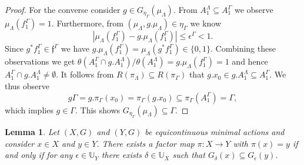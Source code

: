 \documentclass[12pt, reqno]{amsart}
\newtheorem{lemma}[theorem]{Lemma}
\theoremstyle{definition}
\theoremstyle{remark}
\numberwithin{equation}{section}
\theoremstyle{theorem}
\theoremstyle{remark}
\begin{document}
\begin{proof}
    For the converse consider $g\in G_{\eta_\Gamma}(\mu_\Lambda)$. 
    From $A_1^\Lambda\subseteq A_1^\Gamma$ we observe $\mu_\Lambda(f_1^\Gamma)=1$. 
    Furthermore, from $(\mu_\Lambda, g.\mu_\Lambda)\in \eta_\Gamma$ we know
    \[|\mu_\Lambda (f_1^\Gamma)-g.\mu_\Lambda(f_1^\Gamma)|\leq\epsilon^\Gamma<1.\]
    Since $g^*f_1^\Gamma\in \mathfrak{f}^\Gamma$ we have $g.\mu_\Lambda(f_1^\Gamma)=\mu_\Lambda(g^*f_1^\Gamma)\in \{0,1\}$. Combining these observations we get
    $\theta(A_1^\Gamma\cap g.A_1^\Lambda)/\theta(A_1^\Lambda)=g.\mu_\Lambda(f_1^\Gamma)=1$ and hence $A_1^\Gamma\cap g.A_1^\Lambda\neq \emptyset$. 
    It follows from $R(\pi_\Lambda)\subseteq R(\pi_\Gamma)$ that 
    $g.x_0\in g.A_1^\Lambda \subseteq A_1^\Gamma$. 
    We thus observe 
    \[g\Gamma 
    =g.\pi_\Gamma(x_0)
    =\pi_\Gamma(g.x_0)
    \subseteq \pi_\Gamma(A_1^\Gamma)
    =\Gamma,
    \]
    which implies $g\in \Gamma$. 
    This shows $G_{\eta_\Gamma}(\mu_\Lambda)\subseteq\Gamma$. 
\end{proof}

\begin{lemma}\cite[Lemma~4.10]{cortez2026minimal}
\label{lem:factorMapControl}
    Let $(X,G)$ and $(Y,G)$ be equicontinuous minimal actions and consider $x\in X$ and $y\in Y$. 
    There exists a factor map $\pi\colon X\to Y$ with $\pi(x)=y$ if and only if for any $\epsilon\in \mathbb{U}_Y$ there exists $\delta\in \mathbb{U}_X$ such that 
    $G_\delta(x)\subseteq G_\epsilon(y)$. 
\end{lemma}
\end{document}
